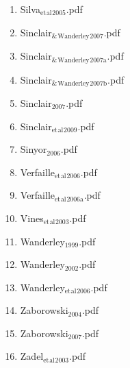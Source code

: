 \documentclass[11pt]{article}
\begin{document}
\begin{enumerate}
\begin{enumerate}
\begin{enumerate}
\item Silva$_{\text{et}}$$_{\text{al}}$$_{\text{2005}}$.pdf
\label{sec-1-1-1-1-49-2-1-7-56}

\item Sinclair$_{\text{\&}}$$_{\text{Wanderley}}$$_{\text{2007}}$.pdf
\label{sec-1-1-1-1-49-2-1-7-57}

\item Sinclair$_{\text{\&}}$$_{\text{Wanderley}}$$_{\text{2007a}}$.pdf
\label{sec-1-1-1-1-49-2-1-7-58}

\item Sinclair$_{\text{\&}}$$_{\text{Wanderley}}$$_{\text{2007b}}$.pdf
\label{sec-1-1-1-1-49-2-1-7-59}

\item Sinclair$_{\text{2007}}$.pdf
\label{sec-1-1-1-1-49-2-1-7-60}

\item Sinclair$_{\text{et}}$$_{\text{al}}$$_{\text{2009}}$.pdf
\label{sec-1-1-1-1-49-2-1-7-61}

\item Sinyor$_{\text{2006}}$.pdf
\label{sec-1-1-1-1-49-2-1-7-62}

\item Verfaille$_{\text{et}}$$_{\text{al}}$$_{\text{2006}}$.pdf
\label{sec-1-1-1-1-49-2-1-7-63}

\item Verfaille$_{\text{et}}$$_{\text{al}}$$_{\text{2006a}}$.pdf
\label{sec-1-1-1-1-49-2-1-7-64}

\item Vines$_{\text{et}}$$_{\text{al}}$$_{\text{2003}}$.pdf
\label{sec-1-1-1-1-49-2-1-7-65}

\item Wanderley$_{\text{1999}}$.pdf
\label{sec-1-1-1-1-49-2-1-7-66}

\item Wanderley$_{\text{2002}}$.pdf
\label{sec-1-1-1-1-49-2-1-7-67}

\item Wanderley$_{\text{et}}$$_{\text{al}}$$_{\text{2006}}$.pdf
\label{sec-1-1-1-1-49-2-1-7-68}

\item Zaborowski$_{\text{2004}}$.pdf
\label{sec-1-1-1-1-49-2-1-7-69}

\item Zaborowski$_{\text{2007}}$.pdf
\label{sec-1-1-1-1-49-2-1-7-70}

\item Zadel$_{\text{et}}$$_{\text{al}}$$_{\text{2003}}$.pdf
\label{sec-1-1-1-1-49-2-1-7-71}
\end{enumerate}


\end{enumerate}
\end{enumerate}
\end{document}
